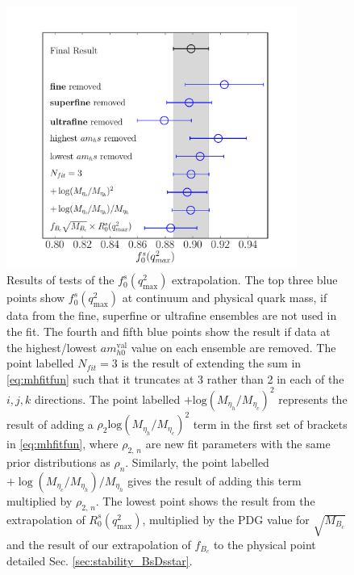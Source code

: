 \begin{figure}[ht]
  \begin{center}
  \hspace{-20pt}
  \includegraphics[width=0.85\textwidth]{images/BsDs/direct/f0q2max_stability.pdf}
  \caption{ Results of tests of the $f_0^s(q^2_{\text{max}})$ extrapolation. The top three blue points show $f_0^s(q^2_{\text{max}})$ at continuum and physical quark mass, if data from the fine, superfine or ultrafine ensembles are not used in the fit. The fourth and fifth blue points show the result if data at the highest/lowest $am_{h0}^{\text{val}}$ value on each ensemble are removed. The point labelled $N_{fit}=3$ is the result of extending the sum in \eqref{eq:mhfitfun} such that it truncates at 3 rather than 2 in each of the $i,j,k$ directions. The point labelled $+\text{log}(M_{\eta_h}/M_{\eta_c})^2$ represents the result of adding a $\rho_{2} \text{log}(M_{\eta_h}/M_{\eta_c})^2$ term in the first set of brackets in \eqref{eq:mhfitfun}, where $\rho_{2,\,n}$ are new fit parameters with the same prior distributions as $\rho_{n}$. Similarly, the point labelled $+\log(M_{\eta_c}/M_{\eta_h})/M_{\eta_h}$ gives the result of adding this term multiplied by $\rho_{2,\,n}$. The lowest point shows the result from the extrapolation of $R_0^s(q^2_{\text{max}})$, multiplied by the PDG value for $\sqrt{M_{B_c}}$ \cite{PhysRevD.98.030001} and the result of our extrapolation of $f_{B_c}$ to the physical point detailed Sec. \ref{sec:stability_BsDsstar}.
    \label{fig:directtests}}
  \end{center}
\end{figure}

